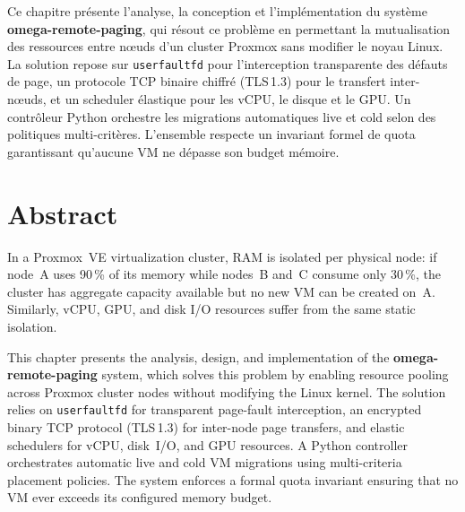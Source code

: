 \documentclass[
    language=english,
    school=estg,
    docstage=final,
    media=paper,
    bookprint=false,
    linkcolor=red!45!black,
    chapterstyle=classic,
    coverstyle=classic,
    aiacknowledgement=false,
    listprefix=false
]{IPLeiriaThesis}
\theoremstyle{definition}
\theoremstyle{plain}
\begin{document}
Ce chapitre présente l'analyse, la conception et l'implémentation du système \textbf{omega-remote-paging}, qui résout ce problème en permettant la mutualisation des ressources entre nœuds d'un cluster Proxmox sans modifier le noyau Linux. La solution repose sur \texttt{userfaultfd} pour l'interception transparente des défauts de page, un protocole TCP binaire chiffré (TLS\,1.3) pour le transfert inter-nœuds, et un scheduler élastique pour les vCPU, le disque et le GPU. Un contrôleur Python orchestre les migrations automatiques live et cold selon des politiques multi-critères. L'ensemble respecte un invariant formel de quota garantissant qu'aucune VM ne dépasse son budget mémoire.



\chapter*{Abstract}

In a Proxmox~VE virtualization cluster, RAM is isolated per physical node: if node~A uses 90\,\% of its memory while nodes~B and~C consume only 30\,\%, the cluster has aggregate capacity available but no new VM can be created on~A. Similarly, vCPU, GPU, and disk I/O resources suffer from the same static isolation.

This chapter presents the analysis, design, and implementation of the \textbf{omega-remote-paging} system, which solves this problem by enabling resource pooling across Proxmox cluster nodes without modifying the Linux kernel. The solution relies on \texttt{userfaultfd} for transparent page-fault interception, an encrypted binary TCP protocol (TLS\,1.3) for inter-node page transfers, and elastic schedulers for vCPU, disk~I/O, and GPU resources. A Python controller orchestrates automatic live and cold VM migrations using multi-criteria placement policies. The system enforces a formal quota invariant ensuring that no VM ever exceeds its configured memory budget.



\bookmarktocentry\tableofcontents
\listoffigures
\listoftables
\end{document}
